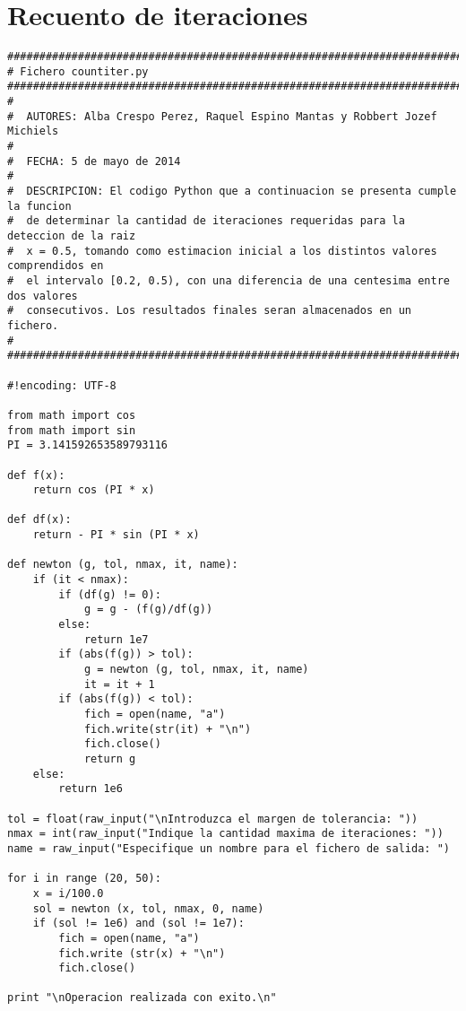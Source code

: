 \section{Recuento de iteraciones}
\label{Apendice2:label}

\begin{center}

\begin{footnotesize}

\begin{verbatim}
#######################################################################################
# Fichero countiter.py
#######################################################################################
#
#  AUTORES: Alba Crespo Perez, Raquel Espino Mantas y Robbert Jozef Michiels
#   
#  FECHA: 5 de mayo de 2014
#
#  DESCRIPCION: El codigo Python que a continuacion se presenta cumple la funcion
#  de determinar la cantidad de iteraciones requeridas para la deteccion de la raiz
#  x = 0.5, tomando como estimacion inicial a los distintos valores comprendidos en
#  el intervalo [0.2, 0.5), con una diferencia de una centesima entre dos valores 
#  consecutivos. Los resultados finales seran almacenados en un fichero.
#
#######################################################################################

#!encoding: UTF-8

from math import cos
from math import sin
PI = 3.141592653589793116

def f(x):
    return cos (PI * x)

def df(x):
    return - PI * sin (PI * x)

def newton (g, tol, nmax, it, name):
    if (it < nmax):
        if (df(g) != 0):
            g = g - (f(g)/df(g))
        else:
            return 1e7
        if (abs(f(g)) > tol):
            g = newton (g, tol, nmax, it, name)
            it = it + 1
        if (abs(f(g)) < tol):
            fich = open(name, "a")
            fich.write(str(it) + "\n")
            fich.close()
            return g
    else:
        return 1e6

tol = float(raw_input("\nIntroduzca el margen de tolerancia: "))
nmax = int(raw_input("Indique la cantidad maxima de iteraciones: "))
name = raw_input("Especifique un nombre para el fichero de salida: ")

for i in range (20, 50):
    x = i/100.0
    sol = newton (x, tol, nmax, 0, name)
    if (sol != 1e6) and (sol != 1e7):
        fich = open(name, "a")
        fich.write (str(x) + "\n")
        fich.close()

print "\nOperacion realizada con exito.\n"

\end{verbatim}

\end{footnotesize}
\end{center}

